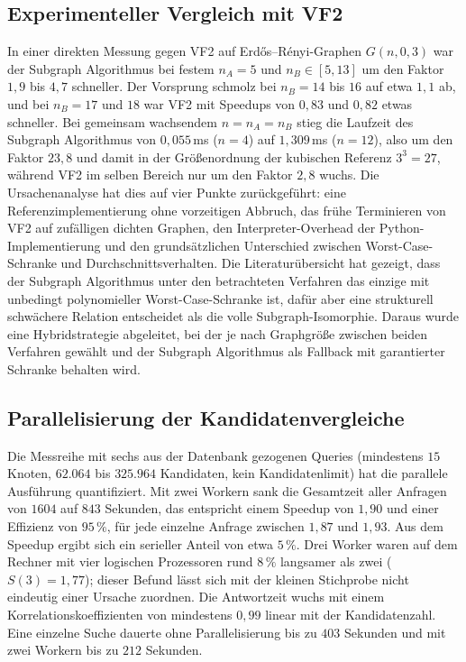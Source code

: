 \documentclass[a4paper,12pt, twoside]{report}
\theoremstyle{definition}
\begin{document}
\subsection{Experimenteller Vergleich mit VF2}

In einer direkten Messung gegen VF2 \cite{cordella2004} auf Erdős–Rényi-Graphen $G(n,0{,}3)$ war der Subgraph Algorithmus bei festem $n_A=5$ und $n_B\in[5,13]$ um den Faktor $1{,}9$ bis $4{,}7$ schneller. Der Vorsprung schmolz bei $n_B=14$ bis $16$ auf etwa $1{,}1$ ab, und bei $n_B=17$ und $18$ war VF2 mit Speedups von $0{,}83$ und $0{,}82$ etwas schneller. Bei gemeinsam wachsendem $n=n_A=n_B$ stieg die Laufzeit des Subgraph Algorithmus von $0{,}055\,$ms ($n=4$) auf $1{,}309\,$ms ($n=12$), also um den Faktor $23{,}8$ und damit in der Größenordnung der kubischen Referenz $3^3=27$, während VF2 im selben Bereich nur um den Faktor $2{,}8$ wuchs. Die Ursachenanalyse hat dies auf vier Punkte zurückgeführt: eine Referenzimplementierung ohne vorzeitigen Abbruch, das frühe Terminieren von VF2 auf zufälligen dichten Graphen, den Interpreter-Overhead der Python-Implementierung und den grundsätzlichen Unterschied zwischen Worst-Case-Schranke und Durchschnittsverhalten. Die Literaturübersicht hat gezeigt, dass der Subgraph Algorithmus unter den betrachteten Verfahren das einzige mit unbedingt polynomieller Worst-Case-Schranke ist, dafür aber eine strukturell schwächere Relation entscheidet als die volle Subgraph-Isomorphie. Daraus wurde eine Hybridstrategie abgeleitet, bei der je nach Graphgröße zwischen beiden Verfahren gewählt und der Subgraph Algorithmus als Fallback mit garantierter Schranke behalten wird.

\subsection{Parallelisierung der Kandidatenvergleiche}

Die Messreihe mit sechs aus der Datenbank gezogenen Queries (mindestens $15$ Knoten, $62.064$ bis $325.964$ Kandidaten, kein Kandidatenlimit) hat die parallele Ausführung quantifiziert. Mit zwei Workern sank die Gesamtzeit aller Anfragen von $1604$ auf $843$ Sekunden, das entspricht einem Speedup von $1{,}90$ und einer Effizienz von $95\,\%$, für jede einzelne Anfrage zwischen $1{,}87$ und $1{,}93$. Aus dem Speedup ergibt sich ein serieller Anteil von etwa $5\,\%$. Drei Worker waren auf dem Rechner mit vier logischen Prozessoren rund $8\,\%$ langsamer als zwei ($S(3)=1{,}77$); dieser Befund lässt sich mit der kleinen Stichprobe nicht eindeutig einer Ursache zuordnen. Die Antwortzeit wuchs mit einem Korrelationskoeffizienten von mindestens $0{,}99$ linear mit der Kandidatenzahl. Eine einzelne Suche dauerte ohne Parallelisierung bis zu $403$ Sekunden und mit zwei Workern bis zu $212$ Sekunden.
\end{document}
